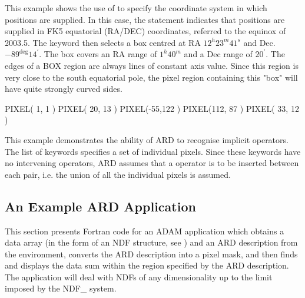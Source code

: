 \documentclass[11pt,nolof]{starlink}
\begin{document}
This example shows the use of  to specify the
coordinate system in which positions are supplied. In this case, the
 statement indicates that positions are
supplied in FK5 equatorial (RA/DEC) coordinates, referred to the equinox
of 2003.5. The  keyword then selects a box centred
at RA $12^{h}23^{m}41^{s}$ and Dec. $-89^{\deg}14^{'}$. The box covers an
RA range of $1^{h}40^{m}$ and a Dec range of $20^{'}$. The edges of a BOX
region are always lines of constant axis value. Since this region is very
close to the south equatorial pole, the pixel region containing this
"box" will have quite strongly curved sides.

\small
\begin{terminalv}
      PIXEL(  1,  1 )
      PIXEL( 20, 13 )
      PIXEL(-55,122 )
      PIXEL(112, 87 )
      PIXEL( 33, 12 )
\end{terminalv}
\normalsize

This example demonstrates the ability of ARD to recognise implicit
 operators. The list of 
keywords specifies a set of individual pixels. Since these keywords have
no intervening operators, ARD assumes that a 
operator is to be inserted between each pair, i.e. the union of all the
individual pixels is assumed.

\subsection{\label{SEC:EXAMC}An Example ARD Application}

This section presents Fortran code for an ADAM application which obtains
a data array (in the form of an NDF structure, see )
and an ARD description from the environment, converts the ARD description
into a pixel mask, and then finds and displays the data sum within the
region specified by the ARD description. The application will deal with
NDFs of any dimensionality up to the limit imposed by the NDF\_ system.
\end{document}

